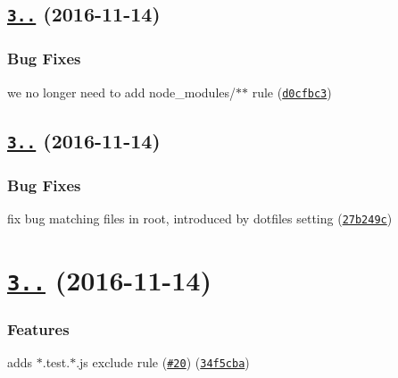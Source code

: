 \label{_3.2.2}%
 \subsection*{\href{https://github.com/istanbuljs/test-exclude/compare/v3.2.1...v3.2.2}{\tt 3..} (2016-\/11-\/14)}

\subsubsection*{Bug Fixes}


\begin{DoxyItemize}
\item we no longer need to add node\+\_\+modules/$\ast$$\ast$ rule (\href{https://github.com/istanbuljs/test-exclude/commit/d0cfbc3}{\tt d0cfbc3})
\end{DoxyItemize}

\label{_3.2.1}%
 \subsection*{\href{https://github.com/istanbuljs/test-exclude/compare/v3.2.0...v3.2.1}{\tt 3..} (2016-\/11-\/14)}

\subsubsection*{Bug Fixes}


\begin{DoxyItemize}
\item fix bug matching files in root, introduced by dotfiles setting (\href{https://github.com/istanbuljs/test-exclude/commit/27b249c}{\tt 27b249c})
\end{DoxyItemize}

\label{_3.2.0}%
 \section*{\href{https://github.com/istanbuljs/test-exclude/compare/v3.1.0...v3.2.0}{\tt 3..} (2016-\/11-\/14)}

\subsubsection*{Features}


\begin{DoxyItemize}
\item adds $\ast$.test.$\ast$.js exclude rule (\href{https://github.com/istanbuljs/test-exclude/issues/20}{\tt \#20}) (\href{https://github.com/istanbuljs/test-exclude/commit/34f5cba}{\tt 34f5cba})
\end{DoxyItemize}

